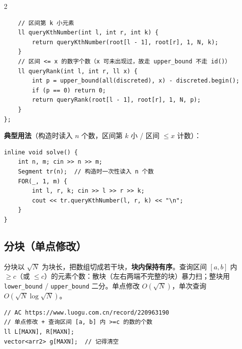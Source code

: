\begin{multicols*}{2}
\begin{verbatim}
    // 区间第 k 小元素
    ll queryKthNumber(int l, int r, int k) {
        return queryKthNumber(root[l - 1], root[r], 1, N, k);
    }
    // 区间 <= x 的数字个数（x 可未出现过，故走 upper_bound 不走 id()）
    ll queryRank(int l, int r, ll x) {
        int p = upper_bound(all(discreted), x) - discreted.begin();
        if (p == 0) return 0;
        return queryRank(root[l - 1], root[r], 1, N, p);
    }
};
	\end{verbatim}

	\textbf{典型用法}（构造时读入 $n$ 个数，区间第 $k$ 小 / 区间 $\le x$ 计数）：

	\begin{verbatim}
inline void solve() {
    int n, m; cin >> n >> m;
    Segment tr(n);  // 构造时一次性读入 n 个数
    FOR(_, 1, m) {
        int l, r, k; cin >> l >> r >> k;
        cout << tr.queryKthNumber(l, r, k) << "\n";
    }
}
	\end{verbatim}

	\subsection{分块（单点修改）}

	分块以 $\sqrt{N}$ 为块长，把数组切成若干块，\textbf{块内保持有序}。查询区间 $[a, b]$ 内 $\ge c$（或 $\le c$）的元素个数：散块（左右两端不完整的块）暴力扫；整块用 \verb|lower_bound| / \verb|upper_bound| 二分。单点修改 $O(\sqrt{N})$，单次查询 $O(\sqrt{N} \log \sqrt{N})$。

	\begin{verbatim}
// AC https://www.luogu.com.cn/record/220963190
// 单点修改 + 查询区间 [a, b] 内 >=c 的数的个数
ll L[MAXN], R[MAXN];
vector<arr2> g[MAXN];  // 记得清空


\end{verbatim}
\end{multicols*}
